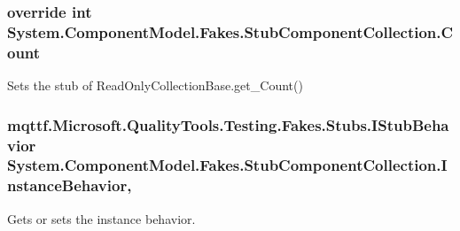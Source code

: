 \hypertarget{class_system_1_1_component_model_1_1_fakes_1_1_stub_component_collection_a15c1fb6c45b2d1536c20deedc7e30f83}{
\subsubsection[{Count}]{\setlength{\rightskip}{0pt plus 5cm}override int System.\-Component\-Model.\-Fakes.\-Stub\-Component\-Collection.\-Count\hspace{0.3cm}{\ttfamily [get]}}}\label{class_system_1_1_component_model_1_1_fakes_1_1_stub_component_collection_a15c1fb6c45b2d1536c20deedc7e30f83}


Sets the stub of Read\-Only\-Collection\-Base.\-get\-\_\-\-Count()

\hypertarget{class_system_1_1_component_model_1_1_fakes_1_1_stub_component_collection_a34fddb858a75dce2ff3b3b0806cb8429}{
\subsubsection[{Instance\-Behavior}]{\setlength{\rightskip}{0pt plus 5cm}mqttf.\-Microsoft.\-Quality\-Tools.\-Testing.\-Fakes.\-Stubs.\-I\-Stub\-Behavior System.\-Component\-Model.\-Fakes.\-Stub\-Component\-Collection.\-Instance\-Behavior\hspace{0.3cm}{\ttfamily [get]}, {\ttfamily [set]}}}\label{class_system_1_1_component_model_1_1_fakes_1_1_stub_component_collection_a34fddb858a75dce2ff3b3b0806cb8429}


Gets or sets the instance behavior.

